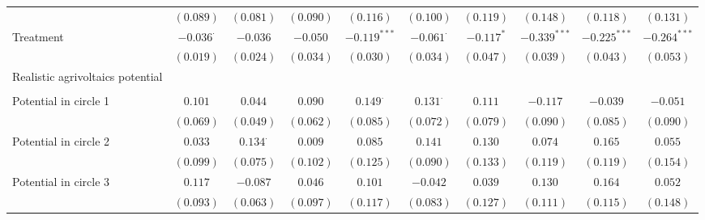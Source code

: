 \begin{center}
\begin{small}
\begin{longtable}{l@{} c@{} c@{} c@{} c@{} c@{} c@{} c@{} c@{} c@{}}
                                    & $(0.089)$        & $(0.081)$       & $(0.090)$       & $(0.116)$        & $(0.100)$        & $(0.119)$        & $(0.148)$        & $(0.118)$        & $(0.131)$        \\
Treatment                           & $-0.036^{\cdot}$ & $-0.036$        & $-0.050$        & $-0.119^{***}$   & $-0.061^{\cdot}$ & $-0.117^{*}$     & $-0.339^{***}$   & $-0.225^{***}$   & $-0.264^{***}$   \\
                                    & $(0.019)$        & $(0.024)$       & $(0.034)$       & $(0.030)$        & $(0.034)$        & $(0.047)$        & $(0.039)$        & $(0.043)$        & $(0.053)$        \\
Realistic agrivoltaics potential    &                  &                 &                 &                  &                  &                  &                  &                  &                  \\
                                    &                  &                 &                 &                  &                  &                  &                  &                  &                  \\
\quad Potential in circle 1         & $0.101$          & $0.044$         & $0.090$         & $0.149^{\cdot}$  & $0.131^{\cdot}$  & $0.111$          & $-0.117$         & $-0.039$         & $-0.051$         \\
                                    & $(0.069)$        & $(0.049)$       & $(0.062)$       & $(0.085)$        & $(0.072)$        & $(0.079)$        & $(0.090)$        & $(0.085)$        & $(0.090)$        \\
\quad Potential in circle 2         & $0.033$          & $0.134^{\cdot}$ & $0.009$         & $0.085$          & $0.141$          & $0.130$          & $0.074$          & $0.165$          & $0.055$          \\
                                    & $(0.099)$        & $(0.075)$       & $(0.102)$       & $(0.125)$        & $(0.090)$        & $(0.133)$        & $(0.119)$        & $(0.119)$        & $(0.154)$        \\
\quad Potential in circle 3         & $0.117$          & $-0.087$        & $0.046$         & $0.101$          & $-0.042$         & $0.039$          & $0.130$          & $0.164$          & $0.052$          \\
                                    & $(0.093)$        & $(0.063)$       & $(0.097)$       & $(0.117)$        & $(0.083)$        & $(0.127)$        & $(0.111)$        & $(0.115)$        & $(0.148)$        \\

\end{longtable}
\end{small}
\end{center}

